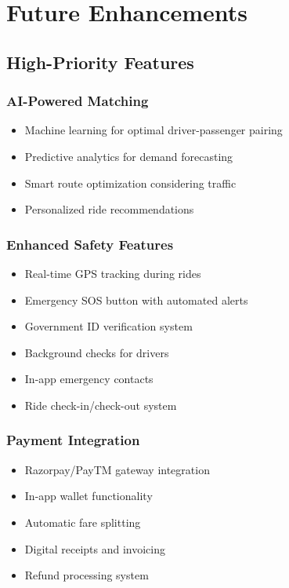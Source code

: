\documentclass[12pt,a4paper]{article}
\begin{document}
\newpage

\section{Future Enhancements}

\subsection{High-Priority Features}

\subsubsection{AI-Powered Matching}
\begin{itemize}
    \item Machine learning for optimal driver-passenger pairing
    \item Predictive analytics for demand forecasting
    \item Smart route optimization considering traffic
    \item Personalized ride recommendations
\end{itemize}

\subsubsection{Enhanced Safety Features}
\begin{itemize}
    \item Real-time GPS tracking during rides
    \item Emergency SOS button with automated alerts
    \item Government ID verification system
    \item Background checks for drivers
    \item In-app emergency contacts
    \item Ride check-in/check-out system
\end{itemize}

\subsubsection{Payment Integration}
\begin{itemize}
    \item Razorpay/PayTM gateway integration
    \item In-app wallet functionality
    \item Automatic fare splitting
    \item Digital receipts and invoicing
    \item Refund processing system
\end{itemize}
\end{document}
